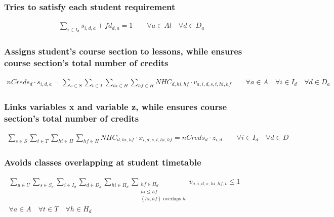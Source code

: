 \subsubsection{Tries to satisfy each student requirement}
\begin{eqnarray}
\sum\limits_{i \in I_{d}} s_{i,d,a} + fd_{d,a} = 1  \nonumber \qquad 
\forall a \in Al \quad
\forall d \in D_{a}
\end{eqnarray}

\subsubsection{Assigns student's course section to lessons, while ensures course section's total number of credits}
\begin{eqnarray}
nCreds_{d} \cdot s_{i,d,a} = \sum\limits_{s \in S}\sum\limits_{t \in T}\sum\limits_{hi \in H}\sum\limits_{hf \in H} NHC_{d,hi,hf} \cdot v_{a,i,d,s,t,hi,hf} \nonumber \qquad 
\forall a \in A \quad
\forall i \in I_{d} \quad
\forall d \in D_{a}
\end{eqnarray}

\subsubsection{Links variables x and variable z, while ensures course section's total number of credits}
\begin{eqnarray}
\sum\limits_{s \in S}\sum\limits_{t \in T}\sum\limits_{hi \in H}\sum\limits_{hf \in H} NHC_{d,hi,hf} \cdot x_{i,d,s,t,hi,hf} = nCreds_{d} \cdot z_{i,d} \nonumber \qquad
\forall i \in I_{d} \quad
\forall d \in D \quad
\end{eqnarray}

\subsubsection{Avoids classes overlapping at student timetable}
\begin{eqnarray}
\sum\limits_{u \in U} \sum\limits_{s \in S_{u}} \sum\limits_{i \in I_{d}} \sum\limits_{d \in D_{a}} \sum\limits_{hi \in H_{d}} \sum_{\substack {hf \in H_{d} \\ hi\le hf \\ (hi,hf)\mbox{ overlaps }h}} v_{a,i,d,s,hi,hf,t}  \leq  1  \nonumber \qquad 
\\
\forall a \in A \quad
\forall t \in T \quad
\forall h \in H_{d} \nonumber
\end{eqnarray}

